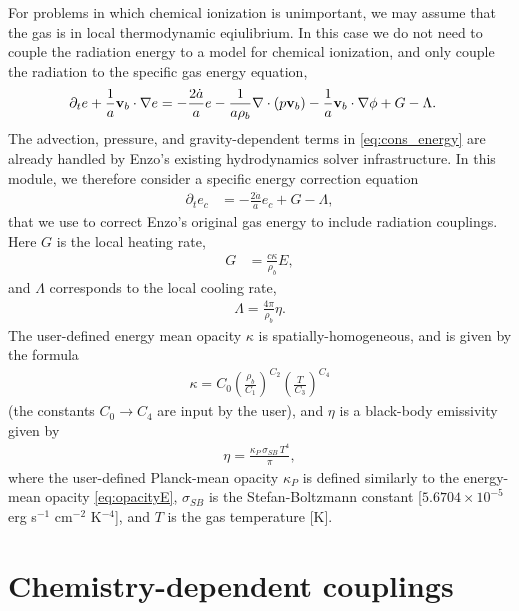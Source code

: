 \documentclass[letterpaper,10pt]{article}
\renewcommand{\(}{\left(}
\renewcommand{\)}{\right)}
\newcommand{\vb}{{\bf v}_b}
\newcommand{\rhob}{\rho_b}
\begin{document}
For problems in which chemical ionization is unimportant, we may
assume that the gas is in local thermodynamic eqiulibrium.  In this
case we do not need to couple the radiation energy to a model for
chemical ionization, and only couple the radiation to the specific gas
energy equation, 
\begin{align}
  \label{eq:cons_energy}
  \partial_t e + \frac1a\vb\cdot\nabla e &=
    - \frac{2\dot{a}}{a}e
    - \frac{1}{a\rhob}\nabla\cdot\left(p\vb\right) 
    - \frac1a\vb\cdot\nabla\phi + G - \Lambda.
\end{align}
The advection, pressure, and gravity-dependent terms in
\eqref{eq:cons_energy} are already handled by Enzo's existing
hydrodynamics solver infrastructure.  In this module, we therefore
consider a specific energy correction equation 
\begin{align}
  \label{eq:cons_energy_correction}
  \partial_t e_c &= -\frac{2\dot{a}}{a}e_c + G - \Lambda,
\end{align}
that we use to correct Enzo's original gas energy to include radiation
couplings.  Here $G$ is the local heating rate,
\begin{align}
\label{eq:G_LTE}
  G &= \frac{c \kappa}{\rhob} E,
\end{align}
and $\Lambda$ corresponds to the local cooling rate,
\begin{align}
\label{eq:Lambda_LTE}
  \Lambda = \frac{4\pi}{\rhob} \eta.
\end{align}
The user-defined energy mean opacity $\kappa$ is
spatially-homogeneous, and is given by the formula
\begin{align}
\label{eq:opacityE}
  \kappa = C_0 \left(\frac{\rhob}{C_1}\right)^{C_2}
    \left(\frac{T}{C_3}\right)^{C_4} 
\end{align}
(the constants $C_0\to C_4$ are input by the user), and $\eta$ is
a black-body emissivity given by 
\begin{align}
\label{eq:etaBB}
  \eta = \frac{\kappa_P\,\sigma_{SB}\,T^4}{\pi},
\end{align}
where the user-defined Planck-mean opacity $\kappa_P$ is defined
similarly to the energy-mean opacity \eqref{eq:opacityE},
$\sigma_{SB}$ is the Stefan-Boltzmann constant [$5.6704\times 10^{-5}$
erg s$^{-1}$ cm$^{-2}$ K$^{-4}$], and $T$ is the gas temperature [K].



\section{Chemistry-dependent couplings}
\label{sec:chem_model}
\end{document}

